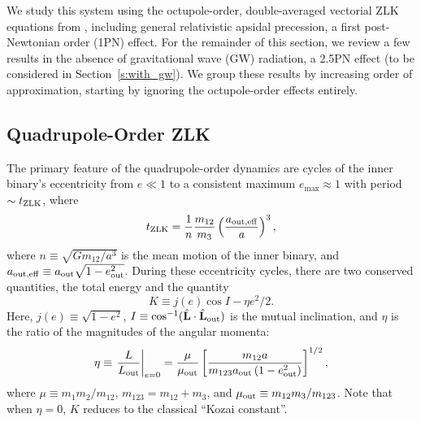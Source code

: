\documentclass[
        fleqn,
        usenatbib,
    ]{mnras}
\newcommand*{\at}[1]{\left.#1\right|}
\newcommand*{\p}[1]{\left(#1\right)}
\newcommand*{\s}[1]{\left[#1\right]}
\newcommand*{\uv}[1]{\hat{\mathbf{#1}}}
\begin{document}
We study this system using the octupole-order, double-averaged vectorial ZLK
equations from \citet{LML15}, including general relativistic apsidal precession,
a first post-Newtonian order (1PN) effect. For the remainder of this section, we
review a few results in the absence of gravitational wave (GW) radiation, a
2.5PN effect (to be considered in Section~\ref{s:with_gw}). We group these
results by increasing order of approximation, starting by ignoring the
octupole-order effects entirely.

\subsection{Quadrupole-Order ZLK}

The primary feature of the quadrupole-order dynamics are cycles of the inner
binary's eccentricity from $e \ll 1$ to a consistent maximum $e_{\max} \approx
1$ with period $\sim t_{\rm ZLK}$, where
\begin{equation}
    t_{\rm ZLK} = \frac{1}{n}\frac{m_{12}}{m_3}
            \p{\frac{a_{\rm out, eff}}{a}}^3,\label{eq:def_tzlk}
\end{equation}
where $n \equiv \sqrt{Gm_{12} / a^3}$ is the mean motion of the inner binary,
and $a_{\rm out, eff} \equiv a_{\rm out}\sqrt{1 - e_{\rm out}^2}$. During these
eccentricity cycles, there are two conserved quantities, the total energy and
the quantity \citep{LML15}
\begin{equation}
    K \equiv j(e) \cos I - \eta e^2 / 2. \label{eq:def_K}
\end{equation}
Here, $j(e) \equiv \sqrt{1 - e^2}$, $I \equiv \cos^{-1}(\uv{L} \cdot
\uv{L}_{\rm out})$ is the mutual inclination, and $\eta$ is the ratio of the
magnitudes of the angular momenta:
\begin{equation}
    \eta \equiv \at{\frac{L}{L_{\rm out}}}_{e = 0}
        = \frac{\mu}{\mu_{\rm out}}\s{\frac{m_{12}a}
            {m_{123}a_{\rm out}\p{1 - e_{\rm out}^2}}}^{1/2},\label{eq:def_eta}
\end{equation}
where $\mu \equiv m_1m_2 / m_{12}$, $m_{123} = m_{12} + m_3$, and $\mu_{\rm out}
\equiv m_{12} m_3 / m_{123}$. Note that when $\eta = 0$, $K$ reduces to the
classical ``Kozai constant''.
\end{document}
